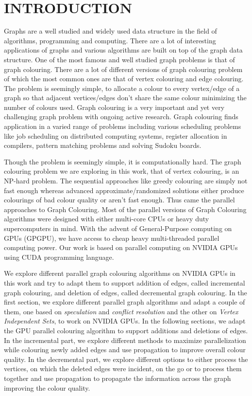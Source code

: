 \documentclass[MTech]{iitmdiss}
\begin{document}




\chapter{INTRODUCTION}
\label{chap:intro}
Graphs are a well studied and widely used data structure in the field of algorithms, programming and computing. There are a lot of interesting applications of graphs and various algorithms are built on top of the graph data structure. One of the most famous and well studied graph problems is that of graph colouring. There are a lot of different versions of graph colouring problem of which the most common ones are that of vertex colouring and edge colouring. The problem is seemingly simple, to allocate a colour to every vertex/edge of a graph so that adjacent vertices/edges don't share the same colour minimizing the number of colours used.  
Graph colouring is a very important and yet very challenging graph problem with ongoing active research. Graph colouring finds application in a varied range of problems including various scheduling problems like job scheduling on distributed computing systems, register allocation in compilers, pattern matching problems and solving Sudoku boards.

Though the problem is seemingly simple, it is computationally hard. The graph colouring problem we are exploring in this work, that of vertex colouring, is an NP-hard problem. The sequential approaches like greedy colouring are simply not fast enough whereas advanced approximate/randomized solutions either produce colourings of bad colour quality or aren't fast enough. Thus came the parallel approaches to Graph Colouring. Most of the parallel versions of Graph Colouring algorithms were designed with either multi-core CPUs or heavy duty supercomputers in mind. With the advent of General-Purpose computing on GPUs (GPGPU), we have access to cheap heavy multi-threaded parallel computing power. Our work is based on parallel computing on NVIDIA GPUs using CUDA programming language.

We explore different parallel graph colouring algorithms on NVIDIA GPUs in this work and try to adapt them to support addition of edges, called incremental graph colouring, and deletion of edges, called decremental graph colouring. In the first section, we explore different parallel graph algorithms and adapt a couple of them, one based on \textit{speculation} and \textit{conflict resolution} and the other on \textit{Vertex Independent Sets}, to work on NVIDIA GPUs. In the following sections, we adapt the GPU parallel colouring algorithm to support additions and deletions of edges. In the incremental part, we explore different methods to maximize parallelization while colouring newly added edges and use propagation to improve overall colour quality. In the decremental part, we explore different options to either process the vertices, on which the deleted edges were incident, on the go or to process them together and use propagation to propagate the information across the graph improving the colour quality. 
\end{document}
